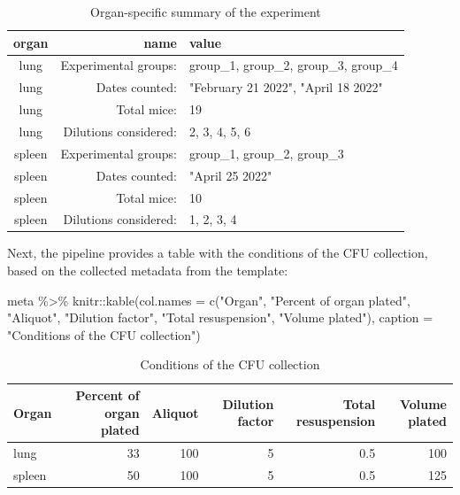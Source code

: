 \documentclass[
]{book}
\newenvironment{Shaded}{\begin{snugshade}}{\end{snugshade}}
\newcommand{\AttributeTok}[1]{\textcolor[rgb]{0.77,0.63,0.00}{#1}}
\newcommand{\FunctionTok}[1]{\textcolor[rgb]{0.00,0.00,0.00}{#1}}
\newcommand{\NormalTok}[1]{#1}
\newcommand{\SpecialCharTok}[1]{\textcolor[rgb]{0.00,0.00,0.00}{#1}}
\newcommand{\StringTok}[1]{\textcolor[rgb]{0.31,0.60,0.02}{#1}}
\begin{document}
\begin{table}

\caption{\label{tab:unnamed-chunk-30}Organ-specific summary of the experiment}
\centering
\begin{tabular}[t]{c|r|l}
\hline
organ & name & value\\
\hline
lung & Experimental groups: & group\_1, group\_2, group\_3, group\_4\\
\hline
lung & Dates counted: & "February 21 2022", "April 18 2022"\\
\hline
lung & Total mice: & 19\\
\hline
lung & Dilutions considered: & 2, 3, 4, 5, 6\\
\hline
spleen & Experimental groups: & group\_1, group\_2, group\_3\\
\hline
spleen & Dates counted: & "April 25 2022"\\
\hline
spleen & Total mice: & 10\\
\hline
spleen & Dilutions considered: & 1, 2, 3, 4\\
\hline
\end{tabular}
\end{table}

Next, the pipeline provides a table with the conditions of the CFU collection,
based on the collected metadata from the template:

\begin{Shaded}
\begin{Highlighting}[]
\NormalTok{meta }\SpecialCharTok{\%\textgreater{}\%} 
\NormalTok{  knitr}\SpecialCharTok{::}\FunctionTok{kable}\NormalTok{(}\AttributeTok{col.names =} \FunctionTok{c}\NormalTok{(}\StringTok{"Organ"}\NormalTok{, }\StringTok{"Percent of organ plated"}\NormalTok{, }\StringTok{"Aliquot"}\NormalTok{, }
                            \StringTok{"Dilution factor"}\NormalTok{, }\StringTok{"Total resuspension"}\NormalTok{, }
                            \StringTok{"Volume plated"}\NormalTok{), }
               \AttributeTok{caption =} \StringTok{"Conditions of the CFU collection"}\NormalTok{)}
\end{Highlighting}
\end{Shaded}

\begin{table}

\caption{\label{tab:unnamed-chunk-31}Conditions of the CFU collection}
\centering
\begin{tabular}[t]{l|r|r|r|r|r}
\hline
Organ & Percent of organ plated & Aliquot & Dilution factor & Total resuspension & Volume plated\\
\hline
lung & 33 & 100 & 5 & 0.5 & 100\\
\hline
spleen & 50 & 100 & 5 & 0.5 & 125\\
\hline
\end{tabular}
\end{table}
\end{document}
